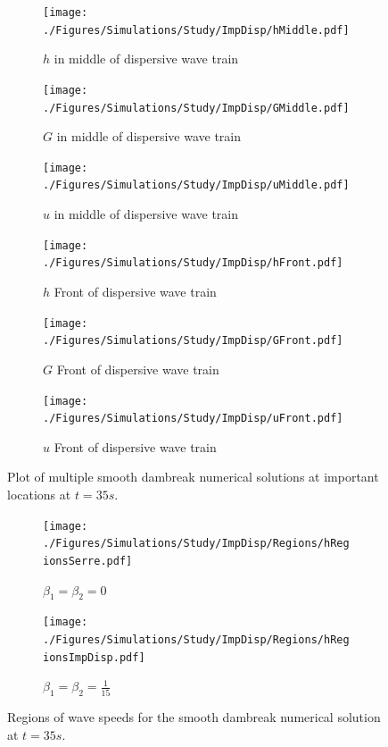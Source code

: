 \documentclass[10pt]{article}
\begin{document}
\begin{figure}
	\centering
	\begin{subfigure}{0.32\textwidth}
		\centering
		\texttt{[image: ./Figures/Simulations/Study/ImpDisp/hMiddle.pdf]}
		\caption{$h$ in middle of dispersive wave train}
	\end{subfigure}
	\begin{subfigure}{0.32\textwidth}
		\centering
		\texttt{[image: ./Figures/Simulations/Study/ImpDisp/GMiddle.pdf]}
		\caption{$G$ in middle of dispersive wave train}
	\end{subfigure}
	\begin{subfigure}{0.32\textwidth}
	\centering
	\texttt{[image: ./Figures/Simulations/Study/ImpDisp/uMiddle.pdf]}
	\caption{$u$ in middle of dispersive wave train}
	\end{subfigure}
	\begin{subfigure}{0.32\textwidth}
	\centering
	\texttt{[image: ./Figures/Simulations/Study/ImpDisp/hFront.pdf]}
	\caption{$h$ Front of dispersive wave train}
	\end{subfigure}
	\begin{subfigure}{0.32\textwidth}
	\centering
	\texttt{[image: ./Figures/Simulations/Study/ImpDisp/GFront.pdf]}
	\caption{$G$ Front of dispersive wave train}
	\end{subfigure}
	\begin{subfigure}{0.32\textwidth}
	\centering
	\texttt{[image: ./Figures/Simulations/Study/ImpDisp/uFront.pdf]}
	\caption{$u$ Front of dispersive wave train}
	\end{subfigure}

	\caption{Plot of multiple smooth dambreak numerical solutions at important locations at $t=35s$.}
\end{figure}

\begin{figure}
	\centering
	\begin{subfigure}{0.49\textwidth}
		\centering
		\texttt{[image: ./Figures/Simulations/Study/ImpDisp/Regions/hRegionsSerre.pdf]}
		\caption{$\beta_1 = \beta_2 = 0$}
	\end{subfigure}
	\begin{subfigure}{0.49\textwidth}
		\centering
		\texttt{[image: ./Figures/Simulations/Study/ImpDisp/Regions/hRegionsImpDisp.pdf]}
		\caption{$\beta_1 = \beta_2 = \frac{1}{15}$}
	\end{subfigure}
	\caption{Regions of wave speeds for the smooth dambreak numerical solution at $t=35s$.}
\end{figure}
\end{document}
